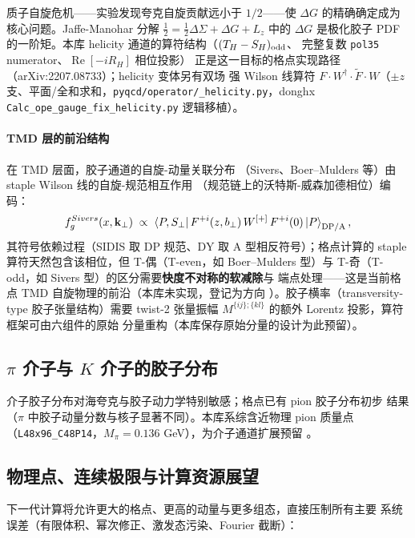 \documentclass[11pt,a4paper]{ctexart}
\newcommand{\code}[1]{\texttt{#1}}
\newcommand{\bperp}{b_{\perp}}
\begin{document}
质子自旋危机——实验发现夸克自旋贡献远小于 $1/2$——使 $\Delta G$
的精确确定成为核心问题。Jaffe-Manohar 分解
$\frac12=\frac12\Delta\Sigma+\Delta G+L_z$ 中的 $\Delta G$ 是极化胶子
PDF 的一阶矩。本库 helicity 通道的算符结构（$(T_H-S_H)_{\rm odd}$、
完整复数 \code{pol35} numerator、$\operatorname{Re}[-iR_H]$ 相位投影）
正是这一目标的格点实现路径（arXiv:2207.08733）；helicity 变体另有双场
强 Wilson 线算符 $F\cdot W^\dagger\cdot\widetilde F\cdot W$（$\pm z$
支、平面/全和求和，\code{pyqcd/operator/\_helicity.py}，donghx
\code{Calc\_ope\_gauge\_fix\_helicity.py} 逻辑移植）。

\paragraph{TMD 层的前沿结构}在 TMD 层面，胶子通道的自旋-动量关联分布
（Sivers、Boer--Mulders 等）由 staple Wilson 线的自旋-规范相互作用
（规范链上的沃特斯-威森加德相位）编码：
\begin{equation}
f_{g}^{Sivers}(x,\mathbf k_\perp)\;\propto\;
\braket{P,S_\perp|\,F^{+i}(z,\bperp)\,W^{[+]}\,F^{+i}(0)\,|P}_{\rm
DP/A},
\end{equation}
其符号依赖过程（SIDIS 取 DP 规范、DY 取 A 型相反符号）；格点计算的
staple 算符天然包含该相位，但 T-偶（T-even，如 Boer--Mulders 型）与
T-奇（T-odd，如 Sivers 型）的区分需要\textbf{快度不对称的软减除}与
端点处理——这是当前格点 TMD 自旋物理的前沿（本库未实现，登记为方向
）。胶子横率（transversity-type 胶子张量结构）需要 twist-2 张量振幅
$M^{\{ij\};\{kl\}}$ 的额外 Lorentz 投影，算符框架可由六组件的原始
分量重构（本库保存原始分量的设计为此预留）。

\subsection{$\pi$ 介子与 $K$ 介子的胶子分布}

介子胶子分布对海夸克与胶子动力学特别敏感；格点已有 pion 胶子分布初步
结果（$\pi$ 中胶子动量分数与核子显著不同）。本库系综含近物理 pion
质量点（\code{L48x96\_C48P14}，$M_\pi=0.136$ GeV），为介子通道扩展预留
。

\subsection{物理点、连续极限与计算资源展望}

下一代计算将允许更大的格点、更高的动量与更多组态，直接压制所有主要
系统误差（有限体积、幂次修正、激发态污染、Fourier 截断）：
\end{document}
